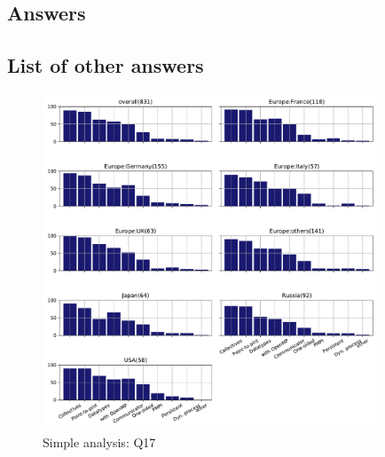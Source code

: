 
\subsection{Answers}


\subsection{List of other answers}
\begin{itemize}

\end{itemize}

\begin{figure}[htb]
\begin{center}
\includegraphics[width=10cm]{../pdfs/Q17.pdf}
\caption{Simple analysis: Q17}
\label{fig:Q17}
\end{center}
\end{figure}
